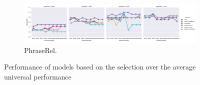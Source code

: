 \begin{figure}
  \begin{subfigure}[t]{\textwidth}
    \includegraphics[width=\textwidth]{supplement/figures/universal-results-PhraseRel}
    \caption{PhraseRel.}
    \label{fig:universal-results-phraserel}
  \end{subfigure}


  \caption{Performance of models based on the selection over the average universal performance}
  \label{fig:universal-results}
\end{figure}

